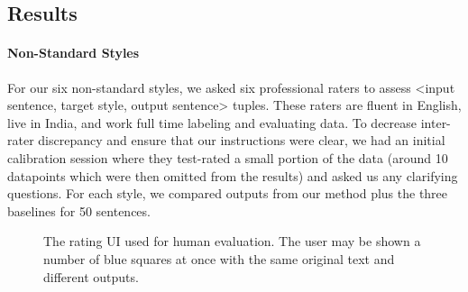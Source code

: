 \subsection{Results}
\paragraph{Non-Standard Styles}
For our six non-standard styles, we asked six professional raters to assess  <input sentence, target style, output sentence> tuples. These raters are fluent in English, live in India, and work full time labeling and evaluating data. To decrease inter-rater discrepancy and ensure that our instructions were clear, we had an initial calibration session where they test-rated a small portion of the data (around 10 datapoints which were then omitted from the results) and asked us any clarifying questions. For each style, we compared outputs from our method plus the three baselines for 50 sentences.

\begin{figure}[tbp]
  \centering
  \caption{The rating UI used for human evaluation. The user may be shown a number of blue squares at once with the same original text and different outputs.}
  \label{fig:rater_ui}
\end{figure} 

